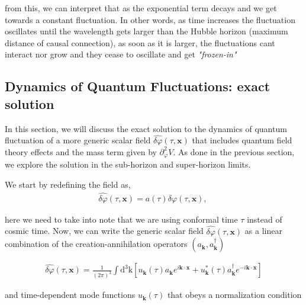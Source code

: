 \begin{itemize}
    from this, we can interpret that as the exponential term decays and we get towards a constant fluctuation. In other words, as time increases the fluctuation oscillates until the wavelength gets larger than the Hubble horizon
    (maximum distance of causal connection), as soon as it is larger, the fluctuations cant interact nor grow and they cease to oscillate and get \emph{"frozen-in"}
\end{itemize}


\subsection{Dynamics of Quantum Fluctuations: exact solution}

In this section, we will discuss the exact solution to the dynamics of quantum fluctuation of a more generic scalar field \(\hat{\delta \varphi}(\tau, \mathbf{x}) \)  that includes quantum field theory effects and the mass term given by $\partial_{\varphi}^{2} V$. As done in the previous section, we explore the solution in the sub-horizon and super-horizon limits.

We start by redefining the field as,
\begin{align}
    \hat{\delta \varphi}(\tau, \mathbf{x})=a(\tau) \delta \varphi(\tau, \mathbf{x}) ,\
\end{align}

here we need to take into note that we are using conformal time $\tau$  instead of cosmic time. Now, we can write the generic scalar field  $\hat{\delta \varphi}(\tau, \mathbf{x})$ as a linear combination of the creation-annihilation operators $\left(a_{\mathbf{k}}, a_{\mathbf{k}}^{\dagger}\right)$

\begin{align}
    \hat{\delta \varphi}(\tau, \mathbf{x})=\frac{1}{(2 \pi)^{3}} \int \mathrm{d}^{3} \mathrm{k}\left[u_{\mathbf{k}}(\tau) a_{\mathbf{k}} e^{i \mathbf{k} \cdot \mathbf{x}}+u_{\mathbf{k}}^{*}(\tau) a_{\mathbf{k}}^{\dagger} e^{-i \mathbf{k} \cdot \mathbf{x}}\right]
\end{align}

and time-dependent mode functions $u_{\mathbf{k}}(\tau)$ that obeys a normalization condition

